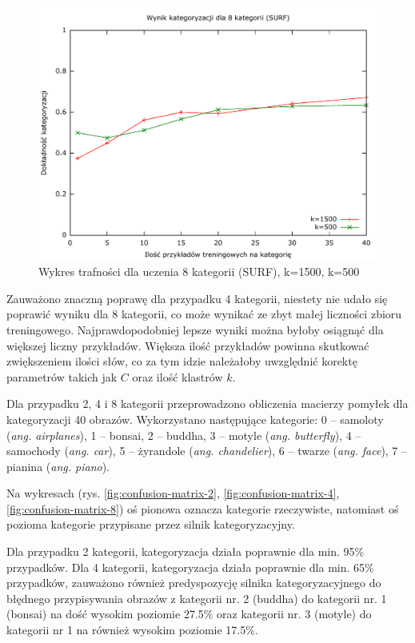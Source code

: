 \begin{figure}[h]
	\centering
	\includegraphics[scale=0.8]{graphics/04_interpretacja_wynikow/result-surf-8-1500-500.pdf}
	\caption{ Wykres trafności dla uczenia 8 kategorii (SURF), k=1500, k=500 }
	\label{fig:result-surf-8-1500-500}
\end{figure}

Zauważono znaczną poprawę dla przypadku 4 kategorii, niestety nie udało się poprawić wyniku dla 8 kategorii, co może wynikać ze zbyt małej liczności zbioru treningowego. Najprawdopodobniej lepsze wyniki można byłoby osiągnąć dla większej liczny przykładów. Większa ilość przykładów powinna skutkować zwiększeniem ilości słów, co za tym idzie należałoby uwzględnić korektę parametrów takich jak $C$ oraz ilość klastrów $k$.

Dla przypadku 2, 4 i 8 kategorii przeprowadzono obliczenia macierzy pomyłek dla kategoryzacji 40 obrazów. Wykorzystano następujące kategorie:
 0 -- samoloty (\emph{ang. airplanes}),
 1 -- bonsai,
 2 -- buddha,
 3 -- motyle (\emph{ang. butterfly}),
 4 -- samochody (\emph{ang. car}),
 5 -- żyrandole (\emph{ang. chandelier}),
 6 -- twarze (\emph{ang. face}),
 7 -- pianina (\emph{ang. piano}).

Na wykresach (rys. \ref{fig:confusion-matrix-2}, \ref{fig:confusion-matrix-4}, \ref{fig:confusion-matrix-8}) oś pionowa oznacza kategorie rzeczywiste, natomiast oś pozioma kategorie przypisane przez silnik kategoryzacyjny.

Dla przypadku 2 kategorii, kategoryzacja działa poprawnie dla min. 95\% przypadków. Dla 4 kategorii, kategoryzacja działa poprawnie dla min. 65\% przypadków, zauważono również predyspozycję silnika kategoryzacyjnego do błędnego przypisywania obrazów z kategorii nr. 2 (buddha) do kategorii nr. 1 (bonsai) na dość wysokim poziomie 27.5\% oraz kategorii nr. 3 (motyle) do kategorii nr 1 na również wysokim poziomie 17.5\%.

